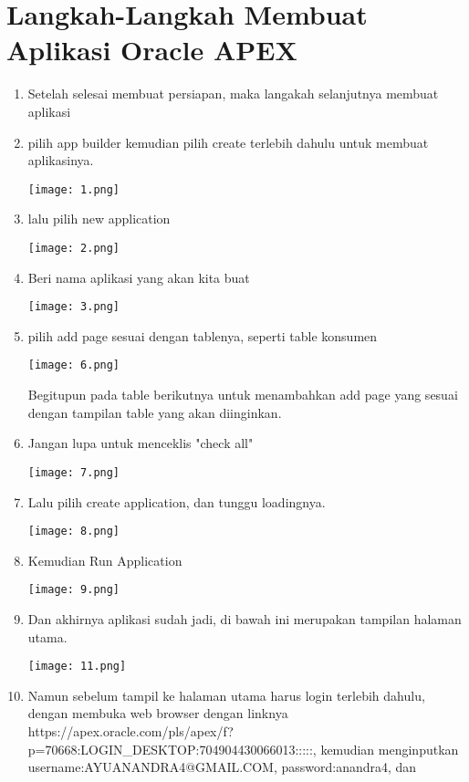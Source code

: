 \documentclass{article}
\begin{document}
\section{Langkah-Langkah Membuat Aplikasi Oracle APEX}
\begin{enumerate}
    \item Setelah selesai membuat persiapan, maka langakah selanjutnya membuat aplikasi
    \item pilih app builder kemudian pilih create terlebih dahulu untuk membuat aplikasinya.
    \begin{center}
    \texttt{[image: 1.png]}
    \end{center}
    \item lalu pilih new application 
    \begin{center}
    \texttt{[image: 2.png]}
    \end{center}
    \item Beri nama aplikasi yang akan kita buat 
    \begin{center}
    \texttt{[image: 3.png]}
    \end{center}
    \item pilih add page sesuai dengan tablenya, seperti table konsumen
    \begin{center}
    \texttt{[image: 6.png]}
    \end{center}
    Begitupun pada table berikutnya untuk menambahkan add page yang sesuai dengan tampilan table yang akan diinginkan.
    \item Jangan lupa untuk menceklis "check all"
    \begin{center}
    \texttt{[image: 7.png]}
    \end{center}
    \item Lalu pilih create application, dan tunggu loadingnya.
    \begin{center}
    \texttt{[image: 8.png]}
    \end{center}
    \item Kemudian Run Application
    \begin{center}
    \texttt{[image: 9.png]}
    \end{center}
    \item Dan akhirnya aplikasi sudah jadi, di bawah ini merupakan tampilan halaman utama.
    \begin{center}
    \texttt{[image: 11.png]}
    \end{center}
    \item Namun sebelum tampil ke halaman utama harus login terlebih dahulu, dengan membuka web browser dengan linknya https://apex.oracle.com/pls/apex/f?p=70668:LOGIN_DESKTOP:704904430066013:::::, kemudian menginputkan username:AYUANANDRA4@GMAIL.COM, password:anandra4, dan 
    
\end{enumerate}
\end{document}
